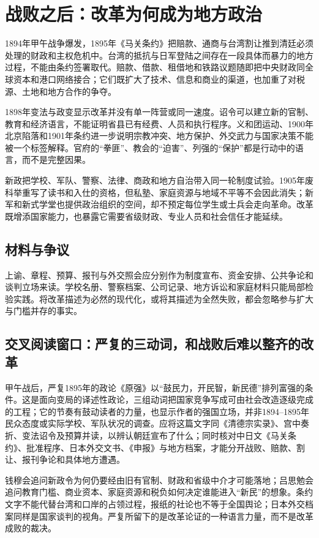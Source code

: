 \section{战败之后：改革为何成为地方政治}

1894年甲午战争爆发，1895年《马关条约》把赔款、通商与台湾割让推到清廷必须处理的财政和主权危机中。台湾的抵抗与日军登陆之间存在一段具体而暴力的地方过程，不能由条约签署取代。赔款、借款、租借地和铁路议题随即把中央财政同全球资本和港口网络接合；它们既扩大了技术、信息和商业的渠道，也加重了对税源、土地和地方合作的争夺。

1898年变法与政变显示改革并没有单一阵营或同一速度。诏令可以建立新的官制、教育和经济语言，不能证明省县已有经费、人员和执行程序。义和团运动、1900年北京陷落和1901年条约进一步说明宗教冲突、地方保护、外交武力与国家决策不能被一个标签解释。官府的“拳匪”、教会的“迫害”、列强的“保护”都是行动中的语言，而不是完整因果。

新政把学校、军队、警察、法律、商政和地方自治带入同一轮制度试验。1905年废科举重写了读书和入仕的资格，但私塾、家庭资源与地域不平等不会因此消失；新军和新式学堂也提供政治组织的空间，却不预定每位学生或士兵会走向革命。改革既增添国家能力，也暴露它需要省级财政、专业人员和社会信任才能延续。

\subsection{材料与争议}

上谕、章程、预算、报刊与外交照会应分别作为制度宣布、资金安排、公共争论和谈判立场来读。学校名册、警察档案、公司记录、地方诉讼和家庭材料只能局部检验实践。将改革描述为必然的现代化，或将其描述为全然失败，都会忽略参与扩大与门槛并存的事实。

\subsection{交叉阅读窗口：严复的三动词，和战败后难以整齐的改革}

甲午战后，严复1895年的政论《原强》以“鼓民力，开民智，新民德”排列富强的条件。这是面向变局的译述性政论，三组动词把国家竞争写成可由社会改造逐级完成的工程；它的节奏有鼓动读者的力量，也显示作者的强国立场，并非1894--1895年民众态度或实际学校、军队状况的调查。应将这篇文字同《清德宗实录》、宫中奏折、变法诏令及预算并读，以辨认朝廷宣布了什么；同时核对中日文《马关条约》、批准程序、日本外交文书、《申报》与地方档案，才能分开战败、赔款、割让、报刊争论和具体地方遭遇。

钱穆会追问新政令为何仍要经由旧有官制、财政和省级中介才可能落地；吕思勉会追问教育门槛、商业资本、家庭资源和税负如何决定谁能进入“新民”的想象。条约文字不能代替台湾和口岸的占领过程，报纸的社论也不等于全国舆论；日本外交档案同样是国家谈判的视角。严复所留下的是改革论证的一种语言力量，而不是改革成败的裁决。
